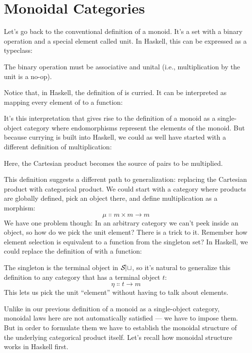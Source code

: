 \section{Monoidal Categories}

Let's go back to the conventional definition of a monoid. It's a set
with a binary operation and a special element called unit. In Haskell,
this can be expressed as a typeclass:

The binary operation  must be associative and unital
(i.e., multiplication by the unit  is a no-op).

Notice that, in Haskell, the definition of  is curried.
It can be interpreted as mapping every element of  to a
function:

It's this interpretation that gives rise to the definition of a monoid
as a single-object category where endomorphisms
 represent the elements of the monoid.
But because currying is built into Haskell, we could as well have
started with a different definition of multiplication:

Here, the Cartesian product  becomes the source of pairs
to be multiplied.

This definition suggests a different path to generalization: replacing
the Cartesian product with categorical product. We could start with a
category where products are globally defined, pick an object 
there, and define multiplication as a morphism:
\[\mu \Colon m\times{}m \to m\]
We have one problem though: In an arbitrary category we can't peek
inside an object, so how do we pick the unit element? There is a trick
to it. Remember how element selection is equivalent to a function from
the singleton set? In Haskell, we could replace the definition of
 with a function:

The singleton is the terminal object in $\mathcal{S\mkern-3mu et}$, so it's natural to
generalize this definition to any category that has a terminal object
$t$:
\[\eta \Colon t \to m\]
This lets us pick the unit ``element'' without having to talk about
elements.

Unlike in our previous definition of a monoid as a single-object
category, monoidal laws here are not automatically satisfied --- we have
to impose them. But in order to formulate them we have to establish the
monoidal structure of the underlying categorical product itself. Let's
recall how monoidal structure works in Haskell first.

